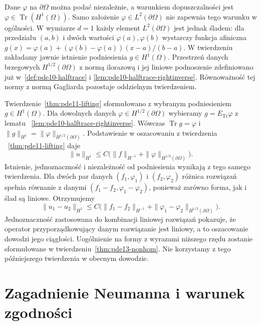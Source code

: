 \begin{uwaga}
Dane $\varphi$ na $\partial\Omega$ można podać niezależnie,
a warunkiem dopuszczalności jest
$\varphi\in\operatorname{Tr}(H^1(\Omega))$.
Samo założenie $\varphi\in L^2(\partial\Omega)$
nie zapewnia tego warunku w ogólności.
W wymiarze $d=1$ każdy element $L^2(\partial\Omega)$
jest jednak śladem: dla przedziału $(a,b)$ i dwóch
wartości $\varphi(a),\varphi(b)$ wystarczy funkcja afiniczna
$g(x)=\varphi(a)+(\varphi(b)-\varphi(a))(x-a)/(b-a)$.
W twierdzeniu zakładamy jawnie istnienie podniesienia
$g\in H^1(\Omega)$.
Przestrzeń danych brzegowych $H^{1/2}(\partial\Omega)$
z normą ilorazową i jej liniowe podnoszenie zdefiniowano
już w~\ref{def:pde10-halftrace} i
\ref{lem:pde10-halftrace-rightinverse}. Równoważność tej
normy z normą Gagliarda pozostaje oddzielnym twierdzeniem.
\end{uwaga}


\begin{uwaga}
Twierdzenie~\ref{thm:pde11-lifting} sformułowano
z wybranym podniesieniem $g\in H^1(\Omega)$.
Dla dowolnych danych $\varphi\in H^{1/2}(\partial\Omega)$
wybieramy $g=E_{\operatorname{Tr}}\varphi$ z lematu
~\ref{lem:pde10-halftrace-rightinverse}. Wówczas
$\operatorname{Tr}g=\varphi$ i
$\|g\|_{H^1}=\|\varphi\|_{H^{1/2}(\partial\Omega)}$.
Podstawienie w oszacowaniu z twierdzenia
~\ref{thm:pde11-lifting} daje
\[
 \|u\|_{H^1}\le C\bigl(\|f\|_{H^{-1}}
             +\|\varphi\|_{H^{1/2}(\partial\Omega)}\bigr).
\]
Istnienie, jednoznaczność i niezależność od podniesienia
wynikają z tego samego twierdzenia.
Dla dwóch par danych $(f_1,\varphi_1)$ i $(f_2,\varphi_2)$
różnica rozwiązań spełnia równanie z danymi
$(f_1-f_2,\varphi_1-\varphi_2)$, ponieważ zarówno
forma, jak i ślad są liniowe. Otrzymujemy
\[
 \|u_1-u_2\|_{H^1}\le C\bigl(\|f_1-f_2\|_{H^{-1}}
       +\|\varphi_1-\varphi_2\|_{H^{1/2}(\partial\Omega)}\bigr).
\]
Jednoznaczność zastosowana do kombinacji liniowej
rozwiązań pokazuje, że operator przyporządkowujący
danym rozwiązanie jest liniowy, a to oszacowanie
dowodzi jego ciągłości.
Uogólnienie na formy z wyrazami niższego rzędu zostanie
sformułowane w twierdzeniu~\ref{thm:pde13-nonhom}.
Nie korzystamy z tego późniejszego twierdzenia
w obecnym dowodzie.
\end{uwaga}

\section{Zagadnienie Neumanna i warunek zgodności}
\label{sec:pde11-neumann}

